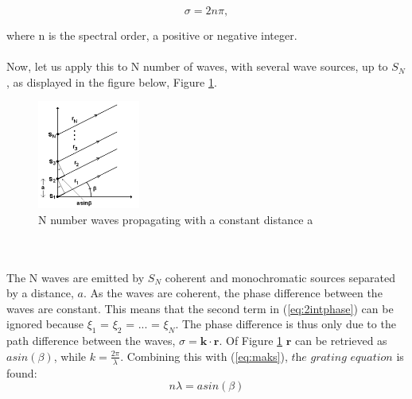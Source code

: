 \begin{equation}
    \sigma = 2 n \pi,
    \label{eq:maks}
\end{equation}

where n is the spectral order, a positive or negative integer. 
\\\\
Now, let us apply this to N number of waves, with several wave sources, up to $S_N$, as displayed in the figure below, Figure \ref{fig:Ninterference}.
\begin{figure}[h]
  \centering
    \includegraphics[width=0.3\textwidth]{Images/theory/Ninterference.png}
    \caption{N number waves propagating with a constant distance a}
    \label{fig:Ninterference}
\end{figure}
\\\\
The N waves are emitted by $S_N$ coherent and monochromatic sources separated by a distance, $a$. As the waves are coherent, the phase difference between the waves are constant. This means that the second term in (\ref{eq:2intphase}) can be ignored because $\xi_1$ = $\xi_2$ = ... = $\xi_N$. The phase difference is thus only due to the path difference between the waves, $\sigma = \textbf{k} \cdot \textbf{r}$. Of Figure \ref{fig:Ninterference}
$\textbf{r}$ can be retrieved as $a sin (\beta)$, while $k= \frac{2 \pi}{\lambda}$. Combining this with (\ref{eq:maks}), $\textit{the grating equation}$ is found: 
\begin{equation}
    n \lambda = a sin(\beta)
    \label{eq:transgrating}
\end{equation}

\vspace{1.3cm}
